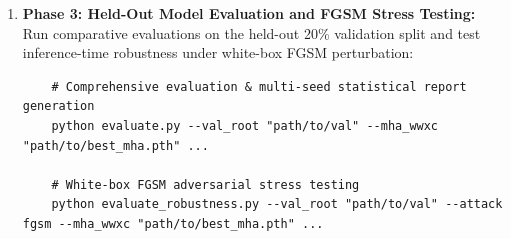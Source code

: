 \documentclass[fleqn,10pt]{wlscirep}
\begin{document}
\begin{enumerate}
    \item \textbf{Phase 3: Held-Out Model Evaluation and FGSM Stress Testing:}
    Run comparative evaluations on the held-out 20\% validation split and test inference-time robustness under white-box FGSM perturbation:
    \begin{verbatim}
    # Comprehensive evaluation & multi-seed statistical report generation
    python evaluate.py --val_root "path/to/val" --mha_wwxc "path/to/best_mha.pth" ...
    
    # White-box FGSM adversarial stress testing
    python evaluate_robustness.py --val_root "path/to/val" --attack fgsm --mha_wwxc "path/to/best_mha.pth" ...
    \end{verbatim}
\end{enumerate}
\end{document}
